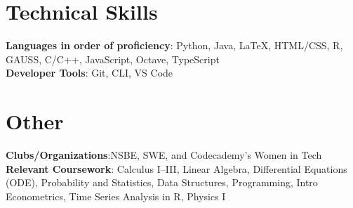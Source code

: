 \documentclass[letterpaper,11.000000001 pt]{article}
\begin{document}
\begin{minipage}[t]{0.48\textwidth}
\section{Technical Skills}
 \begin{itemize}[leftmargin=0.15in, label={}]
    \small{\item{
     \textbf{Languages in order of proficiency}{: Python, Java, LaTeX, \newline HTML/CSS, R, GAUSS, C/C++, JavaScript, Octave, TypeScript} \\
     \textbf{Developer Tools}{: Git, CLI, VS Code} 
     }}
 \end{itemize}
\end{minipage}
\hfill
\vrule
\hfill
\begin{minipage}[t]{0.48\textwidth}
\section{Other}
 \begin{itemize}[leftmargin=0.15in, label={}]
    \small{\item{
    \textbf{Clubs/Organizations}{:NSBE, SWE, and \newline Codecademy's Women in Tech} \\
    \textbf{Relevant Coursework}{: Calculus I--III, Linear Algebra, Differential Equations (ODE), Probability and Statistics, Data Structures, Programming, Intro Econometrics, Time Series Analysis in R, Physics I}
    }}
 \end{itemize}
\end{minipage}
\end{document}
